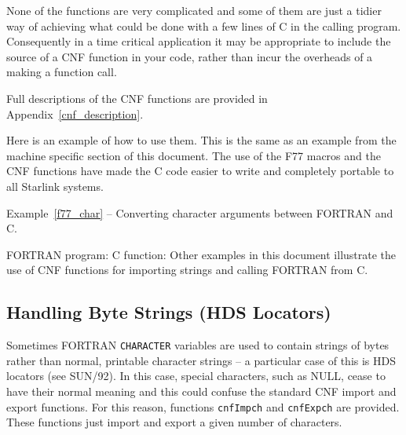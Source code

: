 \documentclass[twoside,11pt]{article}
\newcommand{\htmlref}[2]{#1}
\newcommand{\latex}[1]{#1}
\newcommand{\xref}[3]{#1}
\newcommand{\xlabel}[1]{}
\renewcommand{\_}{\texttt{\symbol{95}}}
\newcounter{examples}
\begin{document}
None of the functions are very complicated and some of them are just a tidier 
way of achieving what could be done with a few lines of C in the calling 
program. Consequently in a time critical application it may be appropriate to 
include the source of a CNF function in your code, rather than incur the 
overheads of a making a function call.

\htmlref{Full descriptions}{cnf_description}
of the CNF functions are
provided\latex{ in Appendix~\ref{cnf_description}}.

Here is an
example of how to use them. This is the same as an example from the machine
specific section of this document. The use of the F77 macros and the CNF
functions have made the C code easier to write and completely portable to all
Starlink systems.

\label{f77_char}
\begin{center}
Example\latex{~\ref{f77_char}}
-- Converting character arguments between FORTRAN and C\@.
\end{center}
\nopagebreak[4]
FORTRAN program:
\pagebreak[1]
C function:
Other examples in this document illustrate the use of CNF functions for
importing strings and calling FORTRAN from C.

\subsection{\xlabel{handling_byte_strings_hds_locators}\label{locators}Handling Byte Strings (HDS Locators)}
Sometimes FORTRAN \texttt{CHARACTER} variables are used to contain strings of 
bytes rather than normal, printable character strings -- a particular case 
of this is 
\xref{HDS locators}{sun92}{using_locators}\latex{ (see SUN/92)}.
In this case, special characters, such as NULL, cease to have their normal 
meaning and this could confuse the standard CNF import and export functions. 
For this reason, functions
\htmlref{\texttt{cnfImpch}}{cnfImpch}
and
\htmlref{\texttt{cnfExpch}}{cnfExpch}
are provided.
These functions just import and export a given number of characters.
\end{document}

